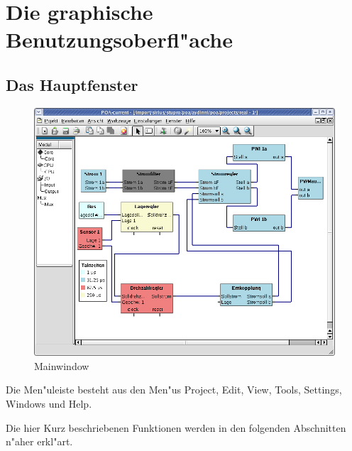 \documentclass[a4paper,titlepage,12pt,ngerman]{scrbook}
\begin{document}
\chapter{Die graphische Benutzungsoberfl"ache}

\section{Das Hauptfenster}
\begin{figure}[htbp]

\begin{center}

\includegraphics[width=15cm]{Mainwindow1}

\caption{Mainwindow}\label{test}

\end{center}

\end{figure}

Die Men"uleiste besteht aus den Men"us Project, Edit, View, Tools, Settings, Windows und Help.\par

Die hier Kurz beschriebenen Funktionen werden in den folgenden Abschnitten n"aher erkl"art.\par
\end{document}

